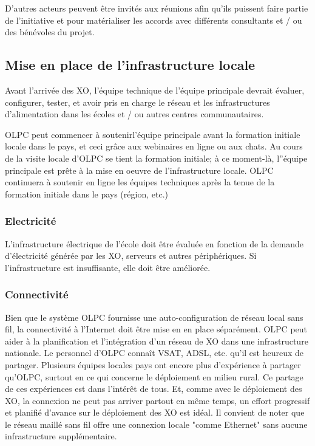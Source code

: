 \documentclass[12pt]{article}
\begin{document}
D'autres acteurs peuvent être invités aux réunions afin qu'ils puissent
faire partie de l'initiative et pour matérialiser les accords avec
différents consultants et / ou des bénévoles du projet.
\subsection{Mise en place de l'infrastructure locale}
\label{sec-9-4}




Avant l'arrivée des XO, l'équipe technique de l'équipe principale devrait
évaluer, configurer, tester, et avoir pris en charge le réseau et les
infrastructures d'alimentation dans les écoles et / ou autres centres
communautaires. 

OLPC peut commencer à soutenirl'équipe principale avant la formation
initiale locale dans le pays, et ceci grâce aux webinaires en ligne ou aux
chats. Au cours de la visite locale d'OLPC  se tient la formation initiale;
à ce moment-là, l''équipe principale est prête à la mise en oeuvre de
l'infrastructure locale. OLPC continuera à soutenir en ligne les équipes
techniques après la tenue de la formation initiale dans le pays (région,
etc.)
\subsubsection{Electricité}
\label{sec-9-4-1}



L'infrastructure électrique de l'école doit être évaluée en fonction de la
demande d'électricité générée par les XO, serveurs et autres
périphériques. Si l'infrastructure est insuffisante, elle doit être
améliorée.
\subsubsection{Connectivité}
\label{sec-9-4-2}



Bien que le système OLPC fournisse une auto-configuration de réseau local
sans fil, la connectivité à l'Internet doit être mise en en place
séparément. OLPC peut aider à la planification et l'intégration d'un réseau
de XO dans une infrastructure nationale. Le personnel d'OLPC connaît VSAT,
ADSL, etc. qu'il est heureux de partager. Plusieurs équipes locales pays
ont encore plus d'expérience à partager qu'OLPC, surtout en ce qui concerne
le déploiement en milieu rural. Ce partage de ces expériences est dans
l'intérêt de tous. Et, comme avec le déploiement des XO,  la connexion ne
peut pas arriver partout en même temps, un effort progressif et planifié
d'avance sur le déploiement des XO est idéal. Il convient de noter que le
réseau maillé sans fil offre une connexion locale "comme Ethernet" sans
aucune infrastructure supplémentaire.
\end{document}
